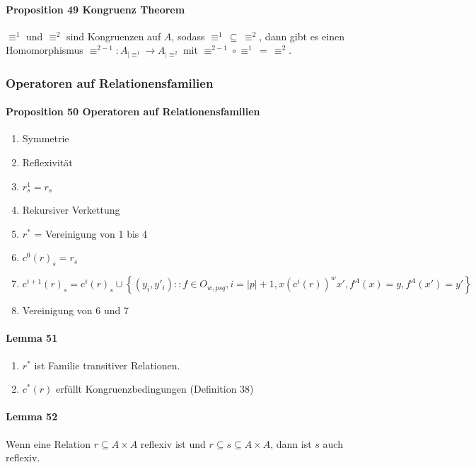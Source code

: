 \paragraph{Proposition 49 Kongruenz Theorem}
$\equiv^{1}$ und $\equiv^{2}$ sind Kongruenzen auf $A$, sodass $\equiv^{1}\,\subseteq\,\equiv^{2}$, dann gibt es einen Homomorphismus $\equiv^{2-1}:A_{|\equiv^{1}}\rightarrow A_{|\equiv^{2}}$
mit $\equiv^{2-1}\circ\equiv^{1}\,=\,\equiv^{2}$.


\subsubsection{Operatoren auf Relationensfamilien}

\paragraph{Proposition 50 Operatoren auf Relationensfamilien}

\begin{enumerate}
\item Symmetrie
\item Reflexivität
\item $r^1_s = r_s$
\item Rekursiver Verkettung 
\item $r^*$ = Vereinigung von 1 bis 4
\item $c^0(r)_s = r_s$
\item $\textrm{c}^{i+1}(r)_{s}=\textrm{c}^{i}(r)_{s}\cup\left\{ \left(y_{i},y'_{i}\right)::f\in O_{w,psq},i=|p|+1,x\left(\textrm{c}^{i}(r)\right)^{w}x',f^{A}(x)=y,f^{A}(x')=y'\right\}$
\item Vereinigung von 6 und 7
\end{enumerate}


\paragraph{Lemma 51}

\begin{enumerate}
\item $r^*$ ist Familie transitiver Relationen.
\item $c^*(r)$ erfüllt Kongruenzbedingungen (Definition 38)
\end{enumerate}


\paragraph{Lemma 52}
Wenn eine Relation $r\subseteq A\times A$ reflexiv ist
und $r\subseteq s\subseteq A\times A$, dann ist $s$ auch reflexiv.


